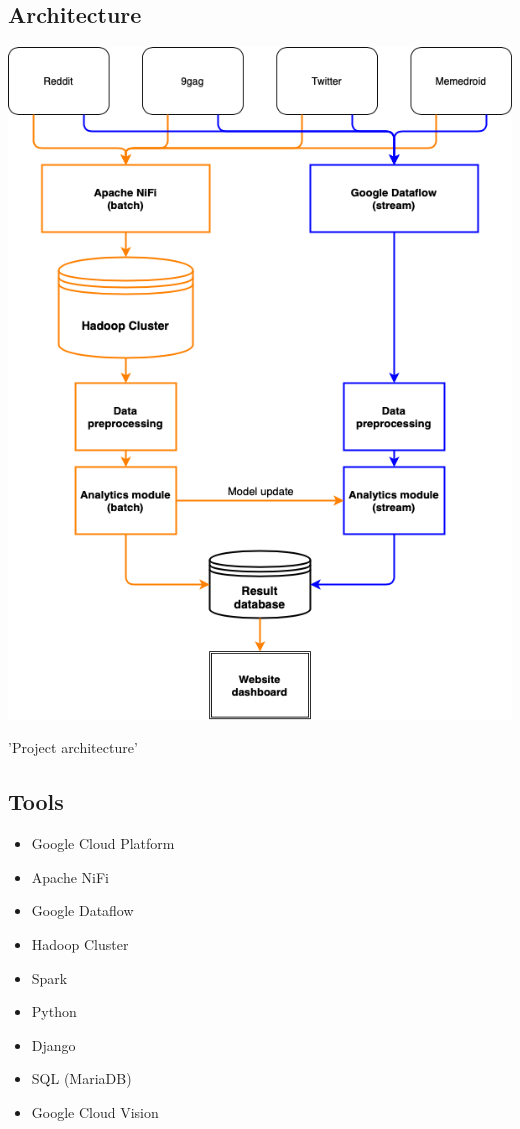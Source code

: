 \documentclass{article}
\begin{document}
\subsection{Architecture}
\begin{center}
\includegraphics[scale = 0.50]{image.png}
\caption{'Project architecture'}
\end{center}
\subsection{Tools}
\begin{itemize}
    \item Google Cloud Platform
    \item Apache NiFi
    \item Google Dataflow
    \item Hadoop Cluster
    \item Spark
    \item Python
    \item Django
    \item SQL (MariaDB)
    \item Google Cloud Vision

\end{itemize}
\end{document}
